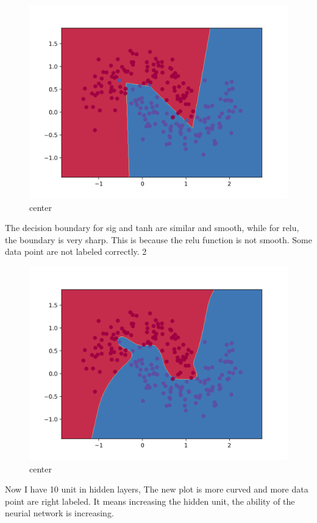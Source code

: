 \documentclass[12pt]{article}
\begin{document}
\begin{figure}[H]
  \caption{center}
  \centering
    \includegraphics[scale=0.2]{relu.png}
\end{figure}

The decision boundary for sig and tanh are similar and smooth, while for relu, the boundary is very sharp.
This is because the relu function is not smooth. Some data point are not labeled correctly.
2

\begin{figure}[H]
  \caption{center}
  \centering
    \includegraphics[scale=0.2]{10.png}
\end{figure}
Now I have 10 unit in hidden layers, The new plot is more curved and more data point are right labeled. It means increasing the hidden unit, the ability of the neurial network is increasing. 
\end{document}
